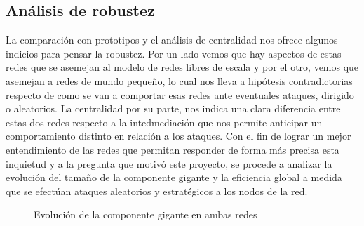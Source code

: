 \documentclass[conference]{IEEEtran}
\begin{document}
\vspace{5pt}

\subsection{Análisis de robustez}
La comparación con prototipos y el análisis de centralidad nos ofrece algunos indicios para pensar la robustez. Por un lado vemos que hay aspectos de estas redes que se asemejan al modelo de redes libres de escala y por el otro, vemos que asemejan a redes de mundo pequeño, lo cual nos lleva a hipótesis contradictorias respecto de como se van a comportar esas redes ante eventuales ataques, dirigido o aleatorios. La centralidad por su parte, nos indica una clara diferencia entre estas dos redes respecto a la intedmediación que nos permite anticipar un comportamiento distinto en relación a los ataques.
Con el fin de lograr un mejor entendimiento de las redes que permitan responder de forma más precisa esta inquietud y a la pregunta que motivó este proyecto, se procede a analizar la evolución del tamaño de la componente gigante y la eficiencia global a medida que se efectúan ataques aleatorios y estratégicos a los nodos de la red.
\begin{figure}[h]
    \centering
    \hfill
    \caption{Evolución de la componente gigante en ambas redes}
    \label{fig:comp_gig_dos_redes}
\end{figure}
\end{document}
